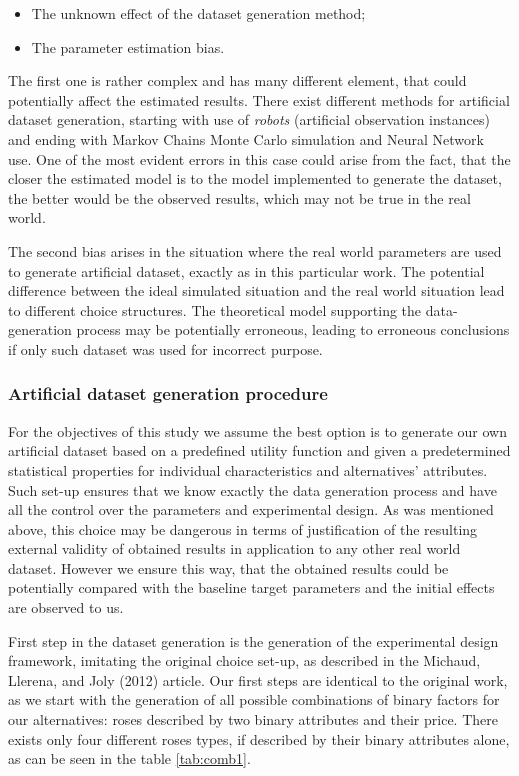 \documentclass[12pt,]{article}
\providecommand{\tightlist}{%
  \setlength{\itemsep}{0pt}\setlength{\parskip}{0pt}}
\begin{document}
\begin{itemize}
\tightlist
\item
  The unknown effect of the dataset generation method;
\item
  The parameter estimation bias.
\end{itemize}

The first one is rather complex and has many different element, that
could potentially affect the estimated results. There exist different
methods for artificial dataset generation, starting with use of
\emph{robots} (artificial observation instances) and ending with Markov
Chains Monte Carlo simulation and Neural Network use. One of the most
evident errors in this case could arise from the fact, that the closer
the estimated model is to the model implemented to generate the dataset,
the better would be the observed results, which may not be true in the
real world.

The second bias arises in the situation where the real world parameters
are used to generate artificial dataset, exactly as in this particular
work. The potential difference between the ideal simulated situation and
the real world situation lead to different choice structures. The
theoretical model supporting the data-generation process may be
potentially erroneous, leading to erroneous conclusions if only such
dataset was used for incorrect purpose.

\hypertarget{artificial-dataset-generation-procedure}{%
\subsubsection{Artificial dataset generation
procedure}\label{artificial-dataset-generation-procedure}}

For the objectives of this study we assume the best option is to
generate our own artificial dataset based on a predefined utility
function and given a predetermined statistical properties for individual
characteristics and alternatives' attributes. Such set-up ensures that
we know exactly the data generation process and have all the control
over the parameters and experimental design. As was mentioned above,
this choice may be dangerous in terms of justification of the resulting
external validity of obtained results in application to any other real
world dataset. However we ensure this way, that the obtained results
could be potentially compared with the baseline target parameters and
the initial effects are observed to us.

First step in the dataset generation is the generation of the
experimental design framework, imitating the original choice set-up, as
described in the Michaud, Llerena, and Joly (2012) article. Our first
steps are identical to the original work, as we start with the
generation of all possible combinations of binary factors for our
alternatives: roses described by two binary attributes and their price.
There exists only four different roses types, if described by their
binary attributes alone, as can be seen in the table \ref{tab:comb1}.
\end{document}
